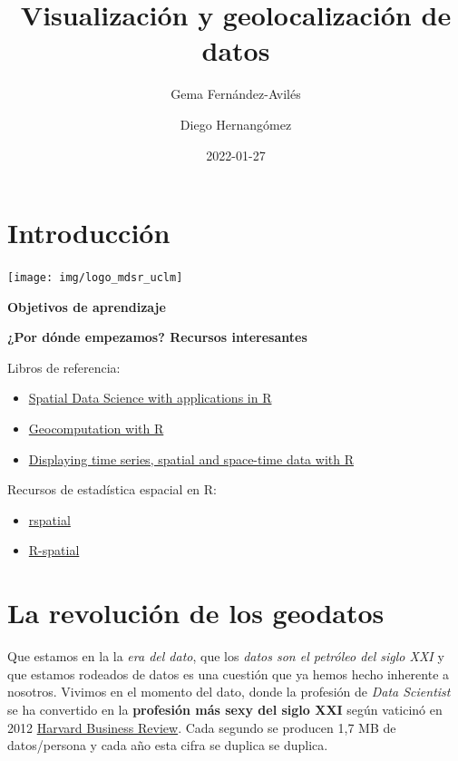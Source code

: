 \documentclass[
]{report}
\title{Visualización y geolocalización de datos}
\author{Gema Fernández-Avilés \and Diego Hernangómez}
\date{2022-01-27}
\providecommand{\tightlist}{%
  \setlength{\itemsep}{0pt}\setlength{\parskip}{0pt}}
\begin{document}
\maketitle

{
\setcounter{tocdepth}{1}
\tableofcontents
}
\hypertarget{introducciuxf3n}{%
\chapter*{Introducción}\label{introducciuxf3n}}

\begin{center}\texttt{[image: img/logo\_mdsr\_uclm]} \end{center}

\textbf{Objetivos de aprendizaje}

\textbf{¿Por dónde empezamos? Recursos interesantes}

Libros de referencia:

\begin{itemize}
\item
  \href{https://keen-swartz-3146c4.netlify.app/}{Spatial Data Science with applications in
  R}
\item
  \href{https://geocompr.robinlovelace.net/}{Geocomputation with R}
\item
  \href{https://oscarperpinan.github.io/bookvis/}{Displaying time series, spatial and space-time data with
  R}
\end{itemize}

Recursos de estadística espacial en R:

\begin{itemize}
\tightlist
\item
  \href{https://rspatial.org/}{rspatial}
\item
  \href{https://r-spatial.org/projects/}{R-spatial}
\end{itemize}

\hypertarget{la-revoluciuxf3n-de-los-geodatos}{%
\chapter{La revolución de los geodatos}\label{la-revoluciuxf3n-de-los-geodatos}}

Que estamos en la la \emph{era del dato}, que los \emph{datos son el petróleo del siglo
XXI} y que estamos rodeados de datos es una cuestión que ya hemos hecho
inherente a nosotros. Vivimos en el momento del dato, donde la profesión de
\emph{Data Scientist} se ha convertido en la \textbf{profesión más sexy del siglo XXI}
según vaticinó en 2012 \href{https://hbr.org/2012/10/data-scientist-the-sexiest-job-of-the-21st-century}{Harvard Business
Review}.
Cada segundo se producen 1,7 MB de datos/persona y cada año esta cifra se
duplica se duplica.
\end{document}
